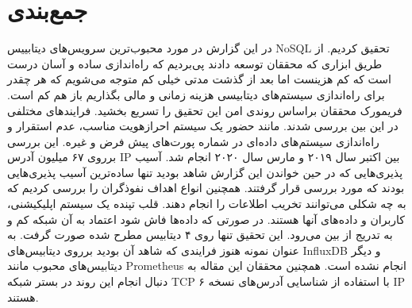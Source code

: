 \documentclass[10pt, a4paper]{article}
\begin{document}
\section{جمع‌بندی}

در این گزارش در مورد محبوب‌ترین سرویس‌های دیتابییس NoSQL تحقیق کردیم. از طریق
ابزاری که محققان توسعه دادند پی‌بردیم که راه‌اندازی ساده و آسان درست است که کم
هزینست اما بعد از گذشت مدتی خیلی کم متوجه می‌شویم که هر چقدر برای راه‌اندازی
سیستم‌های دیتابیسی هزینه زمانی و مالی بگذاریم باز هم کم است. فریمورک محققان
براساس روندی امن این تحقیق را تسریع بخشید. فرایند‌های مختلفی در این بین بررسی
شدند. مانند حضور یک سیستم احرازهویت مناسب، عدم استقرار و راه‌اندازی سیستم‌های
داده‌ای در شماره پورت‌های پیش فرض و غیره. این بررسی برروی ۶۷ میلیون آدرس IP بین
اکتبر سال ۲۰۱۹ و مارس سال ۲۰۲۰ انجام شد. آسیب پذیری‌هایی که در حین خواندن این
گزارش شاهد بودید تنها ساده‌ترین آسیب پذیری‌هایی بودند که مورد بررسی قرار گرفتند.
همچنین انواع اهداف نفوذگران را بررسی کردیم که به چه شکلی می‌توانند تخریب اطلاعات
را انجام دهند. قلب تپنده یک سیستم اپلیکیشنی، کاربران و داده‌های آنها هستند. در
صورتی که داده‌ها فاش شود اعتماد به آن شبکه کم و به تدریج از بین می‌رود. این
تحقیق تنها روی ۴ دیتابیس مطرح شده صورت گرفت. به عنوان نمونه هنوز فرایندی که شاهد
آن بودید برروی دیتابیس‌های InfluxDB و دیگر دیتابیس‌های محبوب مانند Prometheus
انجام نشده است. همچنین محققان این مقاله به دنبال انجام این روند در بستر شبکه TCP
با استفاده از شناسایی آدرس‌های نسخه ۶ IP هستند.
\end{document}
